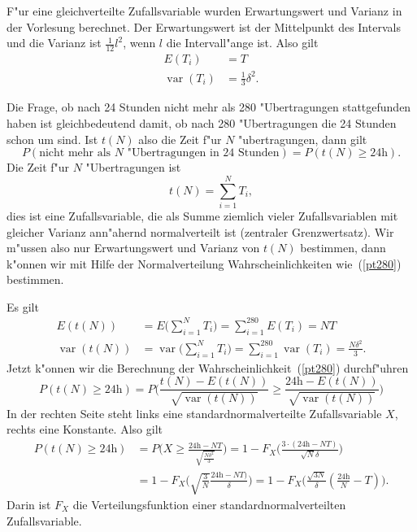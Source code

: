 \begin{loesung}
\begin{teilaufgaben}
\item F"ur eine gleichverteilte Zufallsvariable wurden Erwartungswert
und Varianz in der Vorlesung berechnet.
Der Erwartungswert ist der Mittelpunkt des Intervals und die
Varianz ist $\frac1{12}l^2$, wenn $l$ die Intervall"ange ist.
Also gilt
\begin{align*}
E(T_i)&=T\\
\operatorname{var}(T_i)&=\frac13\delta^2.
\end{align*}
\item
Die Frage, ob nach 24 Stunden nicht mehr als 280 "Ubertragungen
stattgefunden haben ist gleichbedeutend damit, ob nach 280 "Ubertragungen
die 24 Stunden schon um sind. Ist $t(N)$ also die Zeit f"ur $N$
"ubertragungen, dann gilt
\begin{equation}
P(\text{nicht mehr als $N$ "Ubertragungen in 24 Stunden})
=
P(t(N) \ge 24\text{h}).
\label{pt280}
\end{equation}
Die Zeit f"ur $N$ "Ubertragungen ist
\[
t(N)=\sum_{i=1}^NT_i,
\]
dies ist eine Zufallsvariable, die als Summe ziemlich vieler
Zufallsvariablen mit gleicher Varianz ann"ahernd normalverteilt ist
(zentraler Grenzwertsatz). Wir m"ussen also nur Erwartungswert und
Varianz von $t(N)$ bestimmen, dann k"onnen wir mit Hilfe der Normalverteilung
Wahrscheinlichkeiten wie~(\ref{pt280}) bestimmen.

Es gilt
\begin{align*}
E(t(N))
&=
E\biggl(\sum_{i=1}^{N}T_i\biggr)
= \sum_{i=1}^{280}E(T_i)=NT\\
\operatorname{var}(t(N))
&=
\operatorname{var}\biggl(\sum_{i=1}^{N}T_i\biggr)
= \sum_{i=1}^{280}\operatorname{var}(T_i)=\frac{N\delta^2}3.
\end{align*}
Jetzt k"onnen wir die Berechnung der Wahrscheinlichkeit~(\ref{pt280})
durchf"uhren
\[
P(t(N)\ge \text{24h})=
P\biggl(
\frac{t(N)-E(t(N))}{\sqrt{\operatorname{var}(t(N))}}
\ge
\frac{\text{24h}-E(t(N))}{\sqrt{\operatorname{var}(t(N))}}
\biggr)
\]
In der rechten Seite steht links eine standardnormalverteilte
Zufallsvariable $X$, rechts eine Konstante. Also gilt
\begin{align*}
P(t(N)\ge \text{24h})
&
=
P\biggl(
X\ge
\frac{\text{24h}-NT}{\sqrt{\frac{N\delta^2}3}}
\biggr)
=1-F_X\biggl(
\frac{3\cdot(\text{24h}-NT)}{\sqrt{N}\delta}
\biggr)\\
&
=1-F_X\biggl(
\sqrt{\frac{3}{N}}
\frac{\text{24h}-NT)}{\delta}
\biggr)
=1-F_X\biggl(
\frac{\sqrt{3N}}{\delta}
\left(\frac{\text{24h}}{N}-T\right)
\biggr).
\end{align*}
Darin ist $F_X$ die Verteilungsfunktion einer standardnormalverteilten
Zufallsvariable.


\end{teilaufgaben}
\end{loesung}
